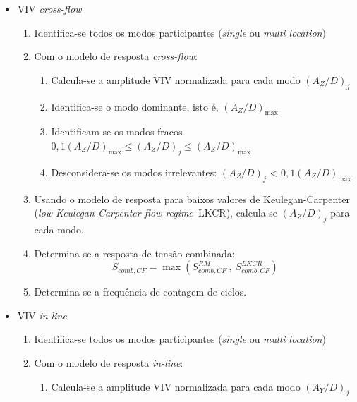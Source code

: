 \begin{itemize}

\item VIV \textit{cross-flow}\label{procedure_cf}

\begin{enumerate}
\item Identifica-se todos os modos participantes (\textit{single} ou \textit{multi location})

\item Com o modelo de resposta \textit{cross-flow}:
	\begin{enumerate}
    \item Calcula-se a amplitude VIV normalizada para cada modo ${(A_Z/D)}_j$

	\item Identifica-se o modo dominante, isto é, ${(A_Z/D)}_{\max}$

    \item Identificam-se os modos fracos $0,1{(A_Z/D)}_{\max} \leq {(A_Z/D)}_j \leq {(A_Z/D)}_{\max}$

    \item Desconsidera-se os modos irrelevantes: ${(A_Z/D)}_j$ < $0,1{(A_Z/D)}_{\max}$
    \end{enumerate}

\item Usando o modelo de resposta para baixos valores de Keulegan-Carpenter (\textit{low Keulegan Carpenter flow regime}--LKCR), calcula-se ${(A_Z/D)}_j$ para cada modo.

\item Determina-se a resposta de tensão combinada:
    \[
    S_{\mathit{comb}, \mathit{CF}} = \max\left( S_{\mathit{comb}, \mathit{CF}}^\mathit{RM} ~,~ S_{\mathit{comb}, \mathit{CF}}^\mathit{LKCR} \right)
    \]

\item Determina-se a frequência de contagem de ciclos.

\end{enumerate}

\item VIV \textit{in-line}

\begin{enumerate}
    \item Identifica-se todos os modos participantes (\textit{single} ou \textit{multi location})

    \item Com o modelo de resposta \textit{in-line}:

    \begin{enumerate}
    	\item Calcula-se a amplitude VIV normalizada para cada modo ${(A_Y/D)}_j$


\end{enumerate}
\end{enumerate}
\end{itemize}
